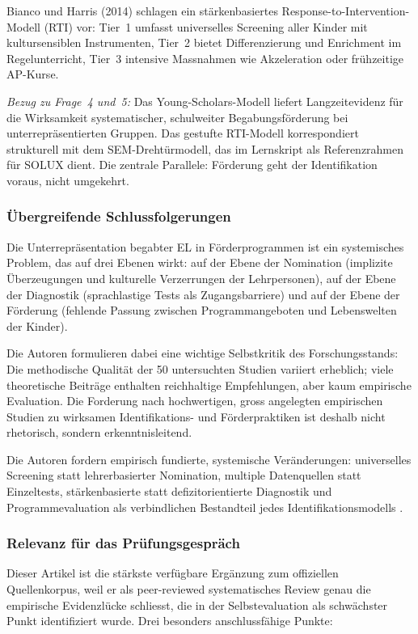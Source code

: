 \documentclass[ngerman, a4paper]{article}
\begin{document}
Bianco und Harris (2014) schlagen ein stärkenbasiertes
Response-to-Intervention-Modell (RTI) vor: Tier~1 umfasst universelles
Screening aller Kinder mit kultursensiblen Instrumenten, Tier~2 bietet
Differenzierung und Enrichment im Regelunterricht, Tier~3 intensive
Massnahmen wie Akzeleration oder frühzeitige AP-Kurse.

\textit{Bezug zu Frage~4 und~5:} Das Young-Scholars-Modell liefert
Langzeitevidenz für die Wirksamkeit systematischer, schulweiter
Begabungsförderung bei unterrepräsentierten Gruppen. Das gestufte
RTI-Modell korrespondiert strukturell mit dem SEM-Drehtürmodell, das im
Lernskript als Referenzrahmen für SOLUX dient. Die zentrale Parallele:
Förderung geht der Identifikation voraus, nicht umgekehrt.

\subsubsection*{Übergreifende Schlussfolgerungen}

Die Unterrepräsentation begabter EL in Förderprogrammen ist ein
systemisches Problem, das auf drei Ebenen wirkt: auf der Ebene der
Nomination (implizite Überzeugungen und kulturelle Verzerrungen der
Lehrpersonen), auf der Ebene der Diagnostik (sprachlastige Tests als
Zugangsbarriere) und auf der Ebene der Förderung (fehlende Passung
zwischen Programmangeboten und Lebenswelten der Kinder).

Die Autoren formulieren dabei eine wichtige Selbstkritik des
Forschungsstands: Die methodische Qualität der 50 untersuchten Studien
variiert erheblich; viele theoretische Beiträge enthalten reichhaltige
Empfehlungen, aber kaum empirische Evaluation. Die Forderung nach
hochwertigen, gross angelegten empirischen Studien zu wirksamen
Identifikations- und Förderpraktiken ist deshalb nicht rhetorisch,
sondern erkenntnisleitend.

Die Autoren
fordern empirisch fundierte, systemische Veränderungen: universelles
Screening statt lehrerbasierter Nomination, multiple Datenquellen statt
Einzeltests, stärkenbasierte statt defizitorientierte Diagnostik und
Programmevaluation als verbindlichen Bestandteil jedes
Identifikationsmodells \parencite{mun2020identifying}.

\subsubsection*{Relevanz für das Prüfungsgespräch}

Dieser Artikel ist die stärkste verfügbare Ergänzung zum offiziellen
Quellenkorpus, weil er als peer-reviewed systematisches Review genau die
empirische Evidenzlücke schliesst, die in der Selbstevaluation als
schwächster Punkt identifiziert wurde. Drei besonders anschlussfähige
Punkte:
\end{document}
